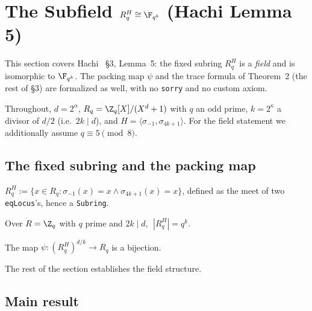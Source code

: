 \section{The Subfield \texorpdfstring{$R_q^H \cong \F_{q^k}$}{R\_q\^{}H ≅ F\_(q\^{}k)} (Hachi Lemma 5)}\label{sec:hachi_subfield}

This section covers Hachi~\cite{NOZ26} \S3, Lemma~5:
the fixed subring $R_q^H$ is a \emph{field} and is isomorphic to $\F_{q^k}$.
The packing map $\psi$ and the trace formula of Theorem~2 (the rest of \S3) are formalized as
well, with no \texttt{sorry} and no custom axiom.

Throughout, $d = 2^\alpha$, $R_q = \Z_q[X]/(X^{d}+1)$ with $q$ an odd prime, $k = 2^\kappa$ a
divisor of $d/2$ (i.e.\ $2k \mid d$), and $H = \langle \sigma_{-1}, \sigma_{4k+1}\rangle$.
For the field statement we additionally assume $q \equiv 5 \pmod 8$.

\subsection{The fixed subring and the packing map}

\begin{definition}\label{def:fixedSubring}
\leanok
$R_q^H := \{x \in R_q : \sigma_{-1}(x) = x \wedge \sigma_{4k+1}(x) = x\}$, defined as the meet of
two \texttt{eqLocus}'s, hence a \texttt{Subring}.
\end{definition}

\begin{theorem}[Cardinality, Eq.~7]\label{thm:card_fixedSubring}
\leanok
{}
Over $R = \Z_q$ with $q$ prime and $2k \mid d$, $\;|R_q^H| = q^{k}$.
\end{theorem}

\begin{theorem}\label{thm:psi_bijective}
\leanok
{}
The map $\psi : (R_q^H)^{d/k} \to R_q$ is a bijection.
\end{theorem}

The rest of the section establishes the field structure.

\subsection{Main result}

